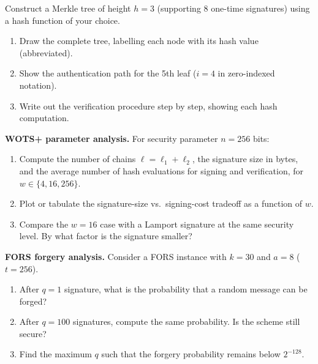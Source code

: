 \begin{prob}
\label{prob:ch10-merkle}
Construct a Merkle tree of height $h = 3$ (supporting 8 one-time signatures) using a hash function of your choice.
\begin{enumerate}
\item[(a)] Draw the complete tree, labelling each node with its hash value (abbreviated).
\item[(b)] Show the authentication path for the 5th leaf ($i = 4$ in zero-indexed notation).
\item[(c)] Write out the verification procedure step by step, showing each hash computation.
\end{enumerate}
\end{prob}

\begin{prob}
\label{prob:ch10-wots}
\textbf{WOTS+ parameter analysis.}  For security parameter $n = 256$ bits:
\begin{enumerate}
\item[(a)] Compute the number of chains $\ell = \ell_1 + \ell_2$, the signature size in bytes, and the average number of hash evaluations for signing and verification, for $w \in \{4, 16, 256\}$.
\item[(b)] Plot or tabulate the signature-size vs.\ signing-cost tradeoff as a function of $w$.
\item[(c)] Compare the $w = 16$ case with a Lamport signature at the same security level.  By what factor is the signature smaller?
\end{enumerate}
\end{prob}

\begin{prob}
\label{prob:ch10-fors-forgery}
\textbf{FORS forgery analysis.}  Consider a FORS instance with $k = 30$ and $a = 8$ ($t = 256$).
\begin{enumerate}
\item[(a)] After $q = 1$ signature, what is the probability that a random message can be forged?
\item[(b)] After $q = 100$ signatures, compute the same probability.  Is the scheme still secure?
\item[(c)] Find the maximum $q$ such that the forgery probability remains below $2^{-128}$.
\end{enumerate}
\end{prob}


